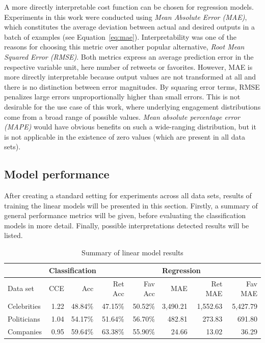 A more directly interpretable cost function can be chosen for regression models.
Experiments in this work were conducted using \textit{Mean Absolute Error (MAE)},
which constitutes the average deviation between actual and desired outputs
in a batch of examples (see Equation~\ref{eq:mae}).
Interpretability was one of the reasons for choosing this metric over another popular alternative,
\textit{Root Mean Squared Error (RMSE)}.
Both metrics express an average prediction error in the respective variable unit,
here number of retweets or favorites.
However, MAE is more directly interpretable because output values
are not transformed at all and there is no distinction between error magnitudes.
By squaring error terms, RMSE penalizes large errors unproportionally higher
than small errors.
This is not desirable for the use case of this work, where underlying
engagement distributions come from a broad range of possible values.
\textit{Mean absolute percentage error (MAPE)} would have obvious benefits
on such a wide-ranging distribution, but it is not applicable in the existence
of zero values (which are present in all data sets).

\subsection{Model performance}
\label{sub:lin_performance}

After creating a standard setting for experiments across all data sets, 
results of training the linear models will be presented in this section.
Firstly, a summary of general performance metrics will be given, before
evaluating the classification models in more detail.
Finally, possible interpretations detected results will be listed.

\begin{table}
\centering
  \begin{tabular}{lrrrrrrr}
    \toprule
    & \multicolumn{4}{l}{Classification} & \multicolumn{3}{l}{Regression} \\
    \midrule
    Data set & CCE & Acc & Ret Acc & Fav Acc & MAE & Ret MAE & Fav MAE \\
    \midrule
    Celebrities & 1.22 & 48.84\% & 47.15\% & 50.52\% & 3,490.21 & 1,552.63 & 5,427.79 \\
    Politicians & 1.04 & 54.17\% & 51.64\% & 56.70\% & 482.81 & 273.83 & 691.80 \\
    Companies & 0.95 & 59.64\% & 63.38\% & 55.90\% & 24.66 & 13.02 & 36.29 \\
    \bottomrule
  \end{tabular}
  \caption{Summary of linear model results}
  \label{tab:lin_model_results}
\end{table}

